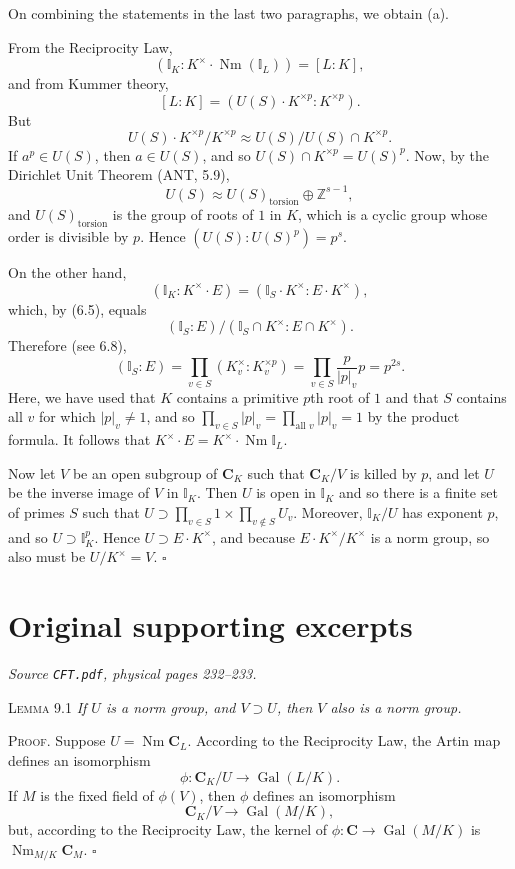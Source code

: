 \documentclass[11pt,a4paper]{article}
\begin{document}
On combining the statements in the last two paragraphs, we obtain (a).

From the Reciprocity Law,
\[
(\mathbb{I}_K:K^\times\cdot\operatorname{Nm}(\mathbb{I}_L))=[L:K],
\]
and from Kummer theory,
\[
[L:K]=(U(S)\cdot K^{\times p}:K^{\times p}).
\]
But
\[
U(S)\cdot K^{\times p}/K^{\times p}
\approx U(S)/U(S)\cap K^{\times p}.
\]
If $a^p\in U(S)$, then $a\in U(S)$, and so
$U(S)\cap K^{\times p}=U(S)^p$. Now, by the Dirichlet Unit Theorem
(ANT, 5.9),
\[
U(S)\approx U(S)_{\mathrm{torsion}}\oplus\mathbb{Z}^{s-1},
\]
and $U(S)_{\mathrm{torsion}}$ is the group of roots of $1$ in $K$,
which is a cyclic group whose order is divisible by $p$. Hence
$(U(S):U(S)^p)=p^s$.

On the other hand,
\[
(\mathbb{I}_K:K^\times\cdot E)
=(\mathbb{I}_S\cdot K^\times:E\cdot K^\times),
\]
which, by (6.5), equals
\[
(\mathbb{I}_S:E)/(\mathbb{I}_S\cap K^\times:E\cap K^\times).
\]
Therefore (see 6.8),
\[
(\mathbb{I}_S:E)=\prod_{v\in S}(K_v^\times:K_v^{\times p})
=\prod_{v\in S}\frac{p}{|p|_v}p=p^{2s}.
\]
Here, we have used that $K$ contains a primitive $p$th root of $1$ and
that $S$ contains all $v$ for which $|p|_v\ne1$, and so
$\prod_{v\in S}|p|_v=\prod_{\text{all }v}|p|_v=1$ by the product
formula. It follows that
$K^\times\cdot E=K^\times\cdot\operatorname{Nm}\mathbb{I}_L$.

Now let $V$ be an open subgroup of $\boldsymbol{C}_K$ such that
$\boldsymbol{C}_K/V$ is killed by $p$, and let $U$ be the inverse image
of $V$ in $\mathbb{I}_K$. Then $U$ is open in $\mathbb{I}_K$ and so
there is a finite set of primes $S$ such that
$U\supset\prod_{v\in S}1\times\prod_{v\notin S}U_v$.
Moreover, $\mathbb{I}_K/U$ has exponent $p$, and so
$U\supset\mathbb{I}_K^p$. Hence $U\supset E\cdot K^\times$, and because
$E\cdot K^\times/K^\times$ is a norm group, so also must be
$U/K^\times=V$. \hfill$\square$

\section*{Original supporting excerpts}
\noindent\emph{Source \texttt{CFT.pdf}, physical pages 232--233.}\par\medskip
\noindent\textsc{Lemma 9.1}
\emph{If $U$ is a norm group, and $V\supset U$, then $V$ also is a
norm group.}

\noindent\textsc{Proof.} Suppose $U=\operatorname{Nm}\boldsymbol{C}_L$.
According to the Reciprocity Law, the Artin map defines an isomorphism
\[
\phi:\boldsymbol{C}_K/U\longrightarrow\operatorname{Gal}(L/K).
\]
If $M$ is the fixed field of $\phi(V)$, then $\phi$ defines an
isomorphism
\[
\boldsymbol{C}_K/V\longrightarrow\operatorname{Gal}(M/K),
\]
but, according to the Reciprocity Law, the kernel of
$\phi:\boldsymbol{C}\longrightarrow\operatorname{Gal}(M/K)$ is
$\operatorname{Nm}_{M/K}\boldsymbol{C}_M$. \hfill$\square$
\end{document}
